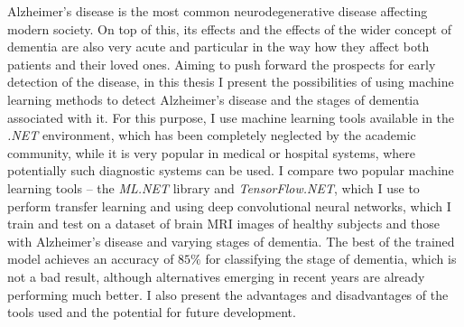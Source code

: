 \begin{abstract-en}

  Alzheimer's disease is the most common neurodegenerative disease affecting modern society.
  On top of this, its effects and the effects of the wider concept of dementia are also very acute and particular in the way how they affect both patients and their loved ones.
  Aiming to push forward the prospects for early detection of the disease, in this thesis I present the possibilities of using machine learning methods to detect Alzheimer's disease and the stages of dementia associated with it.
  For this purpose, I use machine learning tools available in the \emph{.NET} environment, which has been completely neglected by the academic community, while it is very popular in medical or hospital systems, where potentially such diagnostic systems can be used.
  I compare two popular machine learning tools -- the \emph{ML.NET} library and \emph{TensorFlow.NET}, which I use to perform transfer learning and using deep convolutional neural networks, which I train and test on a dataset of brain MRI images of healthy subjects and those with Alzheimer's disease and varying stages of dementia.
  The best of the trained model achieves an accuracy of $85\%$ for classifying the stage of dementia, which is not a bad result, although alternatives emerging in recent years are already performing much better.
  I also present the advantages and disadvantages of the tools used and the potential for future development.

\end{abstract-en}
